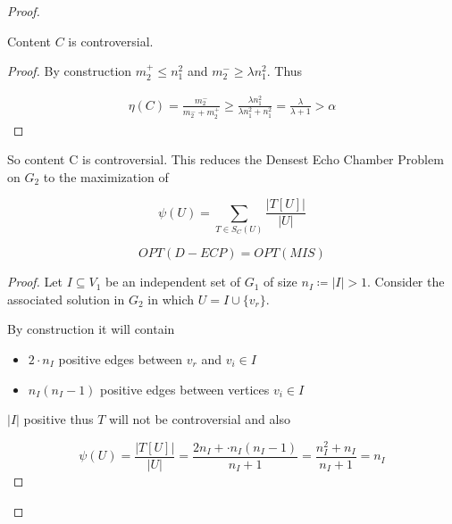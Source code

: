 \begin{proof}
	\begin{claim}
		\label{th:claim-controversial-densest}
		Content $C$ is controversial.
	\end{claim}
	\begin{proof}
		By construction $m_{2}^{+} \leq n_{1}^{2}  $ and $m_{2}^{-} \geq
			\lambda n_{1}^{2} $.
		Thus

		\begin{align}
			\eta(C) = \frac{m_{2}^{-} }{m_{2}^{-} +
				m_{2}^{+} } \geq \frac{\lambda n_{1} ^{2} }{\lambda n_{1}^{2}
				+ n_{1}^{2}  } = \frac{\lambda }{\lambda + 1}
			> \alpha
		\end{align}
	\end{proof}

	So content C is controversial. This reduces the Densest Echo Chamber Problem on $G_2$ to the maximization of

	\begin{equation}
		\label{eq:score-densest}
		\psi(U) = \sum^{}_{T \in S_{C}(U) } \frac{| T[U] |}{|U|}
	\end{equation}

	\begin{claim}
		\label{th:opt-equality-densest}
		\begin{equation}
			OPT(D-ECP) = OPT(MIS)
		\end{equation}
	\end{claim}

	\begin{proof}
		Let $I \subseteq V_{1} $ be an independent set of $G_1$ of size $n_{I}
			\coloneqq |I| > 1$. Consider the associated solution in $G_2$ in
		which $U = I \cup \{v_{r} \}$.

		By construction it will contain
		\begin{itemize}
			\item $2 \cdot n_{I} $ positive edges between $v_{r} $ and $v_{i} \in I$
			\item $n_{I}(n_{I}  -1)$
			      positive edges between vertices $v_{i} \in I$

		\end{itemize}
		$|I|$ positive
		thus $T$ will not be controversial and also

		\begin{equation}
			\label{eq:score-densest-mip}
			\psi(U) = \frac{|T[U]|}{|U|}  = \frac{2n_{I}  +
				\cdot n_{I}(n_{I}  -1) }{n_{I} + 1} = \frac{n_{I}^{2} +
				n_{I}}{n_{I} + 1} = n_{I}
		\end{equation}


\end{proof}
\end{proof}
